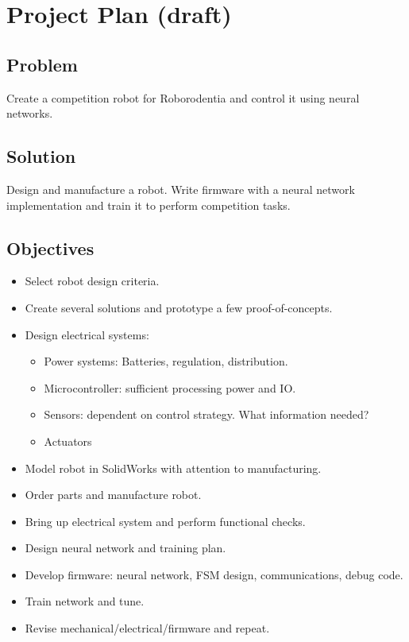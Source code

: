 \documentclass[12pt,letterpaper,titlepage]{report}
\begin{document}
\chapter{Project Plan (draft)}
\section{Problem}
Create a competition robot for Roborodentia and control it using neural networks.

\section{Solution}
Design and manufacture a robot. Write firmware with a neural network implementation and train it to perform competition tasks. 

\section{Objectives}
\begin{itemize}
	\item Select robot design criteria.
	\item Create several solutions and prototype a few proof-of-concepts.
	\item Design electrical systems:
	\begin{itemize}
		\item Power systems: Batteries, regulation, distribution.
		\item Microcontroller: sufficient processing power and IO.
		\item Sensors: dependent on control strategy. What information needed?
		\item Actuators
	\end{itemize}
	\item Model robot in SolidWorks with attention to manufacturing.
	\item Order parts and manufacture robot.
	\item Bring up electrical system and perform functional checks.
	\item Design neural network and training plan.
	\item Develop firmware: neural network, FSM design, communications, debug code.
	\item Train network and tune.
	\item Revise mechanical/electrical/firmware and repeat.
\end{itemize}
\end{document}

